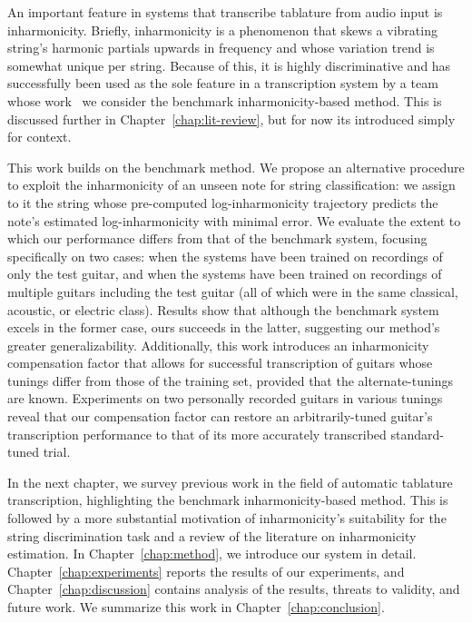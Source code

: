 \documentclass[12pt]{cmuthesis}
\begin{document}
An important feature in systems that transcribe tablature from audio input is inharmonicity. Briefly, inharmonicity is a phenomenon that skews a vibrating string's harmonic partials upwards in frequency and whose variation trend is somewhat unique per string. Because of this, it is highly discriminative and has successfully been used as the sole feature in a transcription system by a team whose work~\cite{barbanchoi2012} we consider the benchmark inharmonicity-based method. This is discussed further in Chapter~\ref{chap:lit-review}, but for now its introduced simply for context.

This work builds on the benchmark method. We propose an alternative procedure to exploit the inharmonicity of an unseen note for string classification: we assign to it the string whose pre-computed log-inharmonicity trajectory predicts the note's estimated log-inharmonicity with minimal error. We evaluate the extent to which our performance differs from that of the benchmark system, focusing specifically on two cases: when the systems have been trained on recordings of only the test guitar, and when the systems have been trained on recordings of multiple guitars including the test guitar (all of which were in the same classical, acoustic, or electric class). Results show that although the benchmark system excels in the former case, ours succeeds in the latter, suggesting our method's greater generalizability. Additionally, this work introduces an inharmonicity compensation factor that allows for successful transcription of guitars whose tunings differ from those of the training set, provided that the alternate-tunings are known. Experiments on two personally recorded guitars in various tunings reveal that our compensation factor can restore an arbitrarily-tuned guitar's transcription performance to that of its more accurately transcribed standard-tuned trial.

In the next chapter, we survey previous work in the field of automatic tablature transcription, highlighting the benchmark inharmonicity-based method. This is followed by a more substantial motivation of inharmonicity's suitability for the string discrimination task and a review of the literature on inharmonicity estimation. In Chapter~\ref{chap:method}, we introduce our system in detail. Chapter~\ref{chap:experiments} reports the results of our experiments, and Chapter~\ref{chap:discussion} contains analysis of the results, threats to validity, and future work. We summarize this work in Chapter~\ref{chap:conclusion}.
\end{document}
